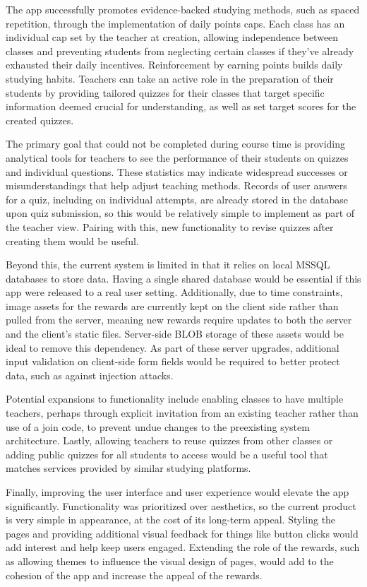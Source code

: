 The app successfully promotes evidence-backed studying methods, such as spaced repetition, through the implementation of daily points caps. Each class has an individual cap set by the teacher at creation, allowing independence between classes and preventing students from neglecting certain classes if they've already exhausted their daily incentives. Reinforcement by earning points builds daily studying habits. Teachers can take an active role in the preparation of their students by providing tailored quizzes for their classes that target specific information deemed crucial for understanding, as well as set target scores for the created quizzes.

The primary goal that could not be completed during course time is providing analytical tools for teachers to see the performance of their students on quizzes and individual questions. These statistics may indicate widespread successes or misunderstandings that help adjust teaching methods. Records of user answers for a quiz, including on individual attempts, are already stored in the database upon quiz submission, so this would be relatively simple to implement as part of the teacher view. Pairing with this, new functionality to revise quizzes after creating them would be useful.

Beyond this, the current system is limited in that it relies on local MSSQL databases to store data. Having a single shared database would be essential if this app were released to a real user setting. Additionally, due to time constraints, image assets for the rewards are currently kept on the client side rather than pulled from the server, meaning new rewards require updates to both the server and the client’s static files. Server-side BLOB storage of these assets would be ideal to remove this dependency. As part of these server upgrades, additional input validation on client-side form fields would be required to better protect data, such as against injection attacks.

Potential expansions to functionality include enabling classes to have multiple teachers, perhaps through explicit invitation from an existing teacher rather than use of a join code, to prevent undue changes to the preexisting system architecture. Lastly, allowing teachers to reuse quizzes from other classes or adding public quizzes for all students to access would be a useful tool that matches services provided by similar studying platforms.

Finally, improving the user interface and user experience would elevate the app significantly. Functionality was prioritized over aesthetics, so the current product is very simple in appearance, at the cost of its long-term appeal. Styling the pages and providing additional visual feedback for things like button clicks would add interest and help keep users engaged. Extending the role of the rewards, such as allowing themes to influence the visual design of pages, would add to the cohesion of the app and increase the appeal of the rewards.

